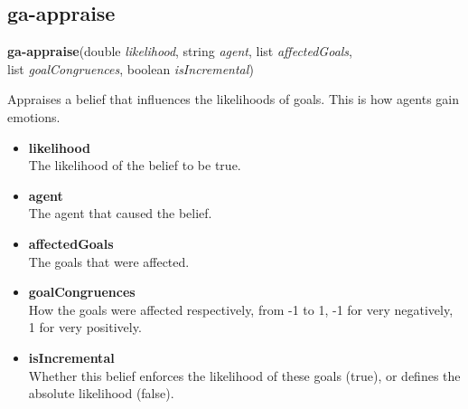 \subsection{ga-appraise}

\textbf{ga-appraise}(double \emph{likelihood}, string \emph{agent}, list \emph{affectedGoals},\\list \emph{goalCongruences}, boolean \emph{isIncremental})

Appraises a belief that influences the likelihoods of goals. This is how agents gain emotions.

\begin{itemize}
	\item \textbf{likelihood} \\ The likelihood of the belief to be true.
	\item \textbf{agent} \\ The agent that caused the belief.
	\item \textbf{affectedGoals} \\ The goals that were affected.
	\item \textbf{goalCongruences} \\ How the goals were affected respectively, from -1 to 1, -1 for very negatively, 1 for very positively.
	\item \textbf{isIncremental} \\ Whether this belief enforces the likelihood of these goals (true), or defines the absolute likelihood (false).
\end{itemize}


